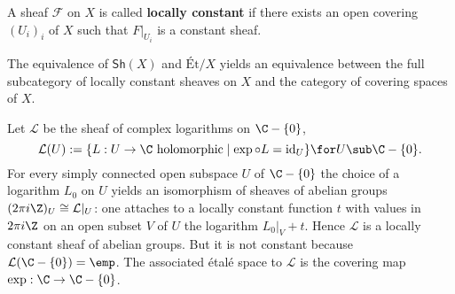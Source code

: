 \begin{proposition}
A sheaf $\mathscr{F}$ on $X$ is called \textbf{locally constant} if there exists an open covering $(U_i)_i$ of $X$ such that $F|_{U_i}$ is a constant sheaf.\par
The equivalence of $\mathsf{Sh}(X)$ and $\text{\'Et/}X$ yields an equivalence between the full subcategory of locally constant sheaves on $X$ and the category of covering spaces of $X$.
\end{proposition}
\begin{example}
Let $\mathcal{L}$ be the sheaf of complex logarithms on $\C-\{0\}$,
\[\mathcal{L}(U):=\{L:U\to\C\text{ holomorphic}\mid \exp\circ L=\mathrm{id}_U\}\for U\sub\C-\{0\}.\]
For every simply connected open subspace $U$ of $\C-\{0\}$ the choice of a logarithm $L_0$ on $U$ yields an isomorphism of sheaves of abelian groups 
$(2\pi i\Z)_U\cong\mathcal{L}|_{U}$: one attaches to a locally constant function $t$ with values in $2\pi i\Z$ on an open subset $V$ of $U$ the logarithm $L_0|_V+t$. 
Hence $\mathcal{L}$ is a locally constant sheaf of abelian groups. But it is not constant because $\mathcal{L}(\C-\{0\})=\emp$. The associated étalé space to 
$\mathcal{L}$ is the covering map $\exp:\C\to\C-\{0\}$.
\end{example}
